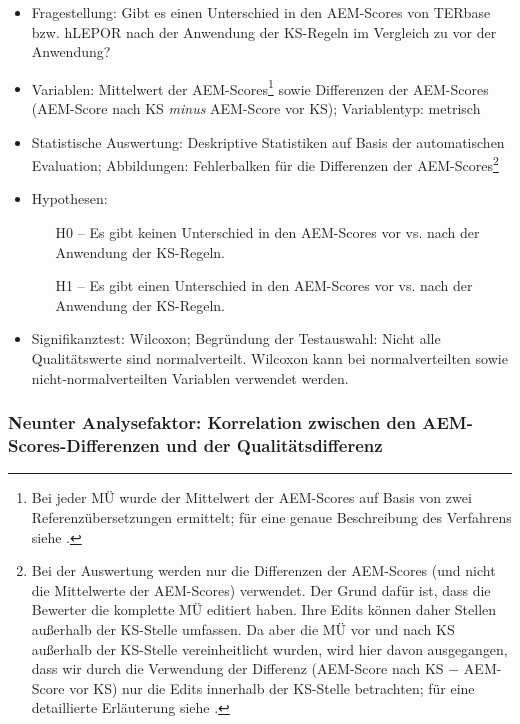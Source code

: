 \begin{itemize}
\item Fragestellung: Gibt es einen Unterschied in den AEM-Scores von TERbase bzw. hLEPOR nach der Anwendung der KS-Regeln im Vergleich zu vor der Anwendung?
\item Variablen: Mittelwert der AEM-Scores\footnote{{{{Bei jeder MÜ wurde der Mittelwert der AEM-Scores auf Basis von zwei Referenzübersetzungen ermittelt; für eine genaue Beschreibung des Verfahrens siehe .}}}} sowie Differenzen der AEM-Scores (AEM-Score nach KS \textit{minus} AEM-Score vor KS); Variablentyp: metrisch
\item Statistische Auswertung: Deskriptive Statistiken auf Basis der automatischen Evaluation; Abbildungen: Fehlerbalken für die Differenzen der AEM-Scores\footnote{{{{Bei der Auswertung werden nur die Differenzen der AEM-Scores (und nicht die Mittelwerte der AEM-Scores) verwendet. Der Grund dafür ist, dass die Bewerter die komplette MÜ editiert haben. Ihre Edits können daher Stellen außerhalb der KS-Stelle umfassen. Da aber die MÜ vor und nach KS außerhalb der KS-Stelle vereinheitlicht wurden, wird hier davon ausgegangen, dass wir durch die Verwendung der Differenz (AEM-Score nach KS $-$ AEM-Score vor KS) nur die Edits innerhalb der KS-Stelle betrachten; für eine detaillierte Erläuterung siehe .}}}}
\item Hypothesen:

  \begin{itemize}[align=left]
  \item [H0 --] Es gibt keinen Unterschied in den AEM-Scores vor vs. nach der Anwendung der KS-Regeln.

  \item [H1 --] Es gibt einen Unterschied in den AEM-Scores vor vs. nach der Anwendung der KS-Regeln.
  \end{itemize}

\item Signifikanztest: Wilcoxon; Begründung der Testauswahl: Nicht alle Qualitätswerte sind normalverteilt. Wilcoxon kann bei normalverteilten sowie nicht-normalverteilten Variablen verwendet werden.
\end{itemize}

\subsubsection{Neunter Analysefaktor: Korrelation zwischen den AEM-Scores-Differenzen und der Qualitätsdifferenz}

